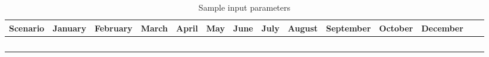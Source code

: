 \begin{table}
\label{tab:Sampleinputparameters}
\begin{tabular}{lccccccccccccc}
\hline 
Scenario & January & February & March & April  & May & June & July & August & September & October & December \\
\hline \

\hline 
\end{tabular}
\caption{Sample input parameters }
\end{table}